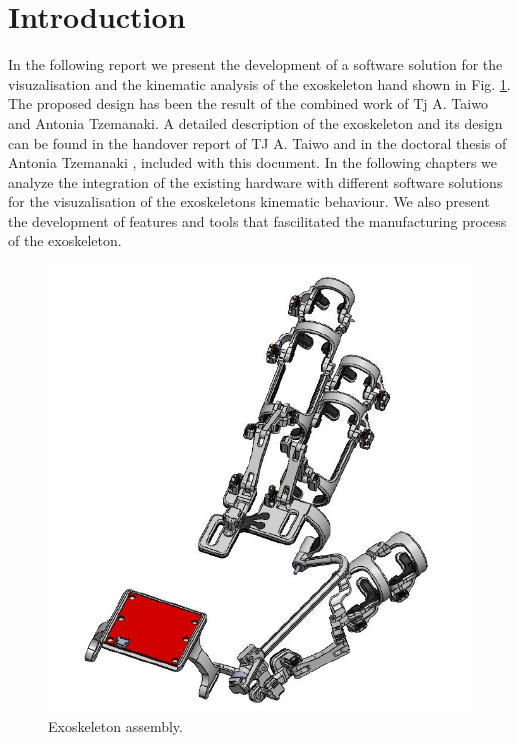 \section{Introduction}

In the following report we present the development of a software 
solution for the visuzalisation and the kinematic analysis of the 
exoskeleton hand shown in Fig. \ref{fig:exoskeleton_assembly}. The proposed 
design has been the result of the combined work of Tj A. Taiwo and Antonia
Tzemanaki. A detailed description of the exoskeleton and its design can be found 
in the handover report of TJ A. Taiwo \cite{tj_a_taiwo_exoskeleton_2021} and
in the doctoral thesis of Antonia Tzemanaki
\cite{tzemanaki_anthropomorphic_nodate}, included with this document.
In the following chapters we analyze the integration of the existing hardware 
with different software solutions for the visuzalisation of the exoskeletons 
kinematic behaviour. We also present the development of features and tools 
that fascilitated the manufacturing process of the exoskeleton.
\begin{figure}[h]
    \centering\includegraphics[width=0.65 \linewidth]{Figures/white_exoskeleton.pdf}
    \caption{Exoskeleton assembly.}
    \label{fig:exoskeleton_assembly}
\end{figure}

